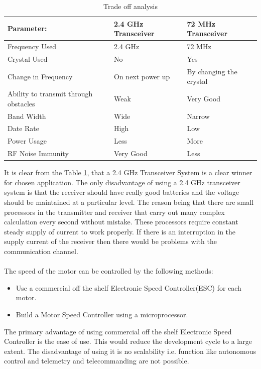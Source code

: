 \begin{center}
\begin{table}[bht]
\begin{tabular}{||l l l||}
\hline\hline
\textbf{Parameter:} &  \textbf{2.4 GHz Transceiver} & \textbf{72 MHz Transceiver}\\ 
\hline
Frequency Used & 2.4 GHz & 72 MHz \\
Crystal Used & No & Yes \\
Change in Frequency & On next power up & By changing the crystal \\
Ability to transmit through obstacles & Weak & Very Good\\
Band Width & Wide & Narrow\\
Date Rate & High & Low\\
Power Usage & Less & More\\
RF Noise Immunity & Very Good & Less \\
\hline
\end{tabular}
\caption{Trade off analysis}
\label{tab:TradeOff}
\end{table}
\end{center}

It is clear from the Table \ref{tab:TradeOff}, that a 2.4 GHz Transceiver System is a clear winner for chosen application. The only disadvantage of using a 2.4 GHz transceiver system is that the receiver should have really good batteries and the voltage should be maintained at a particular level. The reason being that there are small processors in the transmitter and receiver that carry out many complex calculation every second without mistake. These processors require constant steady supply of current to work properly. If there is an interruption in the supply current of the receiver then there would be problems with the communication channel.
\\
\\
The speed of the motor can be controlled by the following methods:
\begin{itemize}
\item Use a commercial off the shelf Electronic Speed Controller(ESC) for each motor.
\item Build a Motor Speed Controller using a microprocessor.
\end{itemize}

The primary advantage of using commercial off the shelf Electronic Speed Controller is the ease of use. This would reduce the development cycle to a large extent. The disadvantage of using it is no scalability i.e. function like autonomous control and telemetry and telecommanding are not possible.

